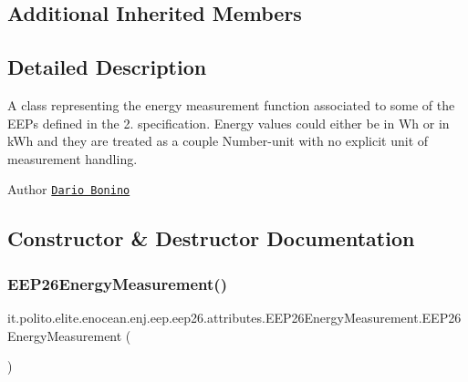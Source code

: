 \subsection*{Additional Inherited Members}


\subsection{Detailed Description}
A class representing the energy measurement function associated to some of the E\+E\+Ps defined in the 2. specification. Energy values could either be in Wh or in k\+Wh and they are treated as a couple Number-\/unit with no explicit unit of measurement handling.

\begin{DoxyAuthor}{Author}
\href{mailto:dario.bonino@gmail.com}{\tt Dario Bonino} 
\end{DoxyAuthor}


\subsection{Constructor \& Destructor Documentation}
\hypertarget{classit_1_1polito_1_1elite_1_1enocean_1_1enj_1_1eep_1_1eep26_1_1attributes_1_1_e_e_p26_energy_measurement_af174085ad8d0b921d89fc08e98fa6e55}{}\label{classit_1_1polito_1_1elite_1_1enocean_1_1enj_1_1eep_1_1eep26_1_1attributes_1_1_e_e_p26_energy_measurement_af174085ad8d0b921d89fc08e98fa6e55} 
\subsubsection{\texorpdfstring{E\+E\+P26\+Energy\+Measurement()}{EEP26EnergyMeasurement()}\hspace{0.1cm}{\footnotesize\ttfamily [1/2]}}
{\footnotesize\ttfamily it.\+polito.\+elite.\+enocean.\+enj.\+eep.\+eep26.\+attributes.\+E\+E\+P26\+Energy\+Measurement.\+E\+E\+P26\+Energy\+Measurement (\begin{DoxyParamCaption}{ }\end{DoxyParamCaption})}

